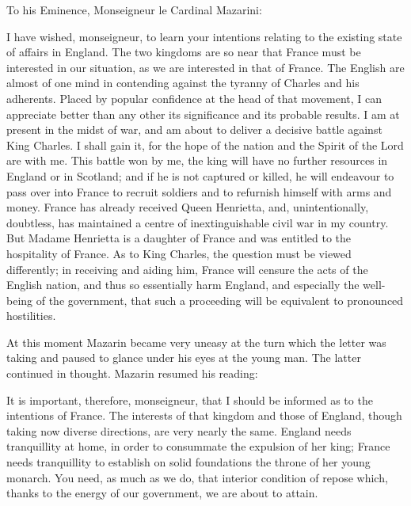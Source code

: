 \begin{mail}{}{To his Eminence, Monseigneur le Cardinal Mazarini:}

I have wished, monseigneur, to learn your intentions relating to the existing state of affairs in England. The two kingdoms are so near that France must be interested in our situation, as we are interested in that of France. The English are almost of one mind in contending against the tyranny of Charles and his adherents. Placed by popular confidence at the head of that movement, I can appreciate better than any other its significance and its probable results. I am at present in the midst of war, and am about to deliver a decisive battle against King Charles. I shall gain it, for the hope of the nation and the Spirit of the Lord are with me. This battle won by me, the king will have no further resources in England or in Scotland; and if he is not captured or killed, he will endeavour to pass over into France to recruit soldiers and to refurnish himself with arms and money. France has already received Queen Henrietta, and, unintentionally, doubtless, has maintained a centre of inextinguishable civil war in my country. But Madame Henrietta is a daughter of France and was entitled to the hospitality of France. As to King Charles, the question must be viewed differently; in receiving and aiding him, France will censure the acts of the English nation, and thus so essentially harm England, and especially the well-being of the government, that such a proceeding will be equivalent to pronounced hostilities.

\pausemail
At this moment Mazarin became very uneasy at the turn which the letter was taking and paused to glance under his eyes at the young man. The latter continued in thought. Mazarin resumed his reading:

\resumemail
It is important, therefore, monseigneur, that I should be informed as to the intentions of France. The interests of that kingdom and those of England, though taking now diverse directions, are very nearly the same. England needs tranquillity at home, in order to consummate the expulsion of her king; France needs tranquillity to establish on solid foundations the throne of her young monarch. You need, as much as we do, that interior condition of repose which, thanks to the energy of our government, we are about to attain.


\end{mail}
